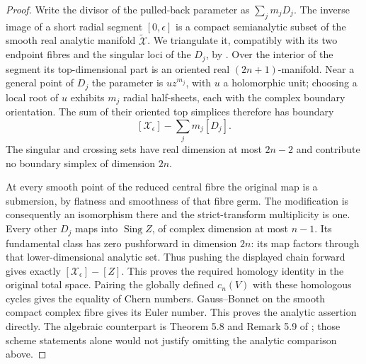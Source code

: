 \begin{proof}
Write the divisor of the pulled-back parameter as
$\sum_j m_jD_j$. The inverse image of a short radial segment
$[0,\epsilon]$ is a compact semianalytic subset of the smooth real
analytic manifold $\widetilde{\mathcal X}$. We triangulate it,
compatibly with its two endpoint fibres and the singular loci of the
$D_j$, by \cite[Section~3, Theorems~1--2, pp.~463--464]{Loj64}.
Over the interior of the segment its top-dimensional part is an
oriented real $(2n+1)$-manifold. Near a general point of $D_j$ the
parameter is $u z^{m_j}$, with $u$ a holomorphic unit; choosing a
local root of $u$ exhibits $m_j$ radial half-sheets, each with the
complex boundary orientation. The sum of their oriented top
simplices therefore has boundary
\[
 [\mathcal X_\epsilon]-\sum_jm_j[D_j].
\]
The singular and crossing sets have real dimension at most $2n-2$
and contribute no boundary simplex of dimension $2n$.

At every smooth point of the reduced central fibre the original
map is a submersion, by flatness and smoothness of that fibre germ.
The modification is consequently an isomorphism there and the
strict-transform multiplicity is one. Every other $D_j$ maps into
$\operatorname{Sing}Z$, of complex dimension at most $n-1$.
Its fundamental class has zero pushforward in dimension $2n$:
its map factors through that lower-dimensional analytic set.
Thus pushing the displayed chain forward gives exactly
$[\mathcal X_\epsilon]-[Z]$. This proves the required homology
identity in the original total space. Pairing the globally defined
$c_n(V)$ with these homologous cycles gives the equality of
Chern numbers. Gauss--Bonnet on the smooth compact complex
fibre gives its Euler number. This proves the analytic assertion
directly. The algebraic counterpart is Theorem 5.8 and
Remark 5.9 of \cite{FG10}; those scheme statements alone would
not justify omitting the analytic comparison above.
\end{proof}